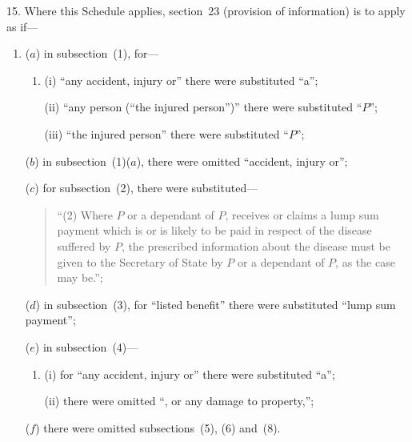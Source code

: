 \documentclass[12pt,a4paper]{article}
\begin{document}
15.  Where this Schedule applies, section~23 (provision of information) is to apply as if—
\begin{enumerate}\item[]
($a$) in subsection~(1), for—
\begin{enumerate}\item[]
(i) “any accident, injury or” there were substituted “a”;

(ii) “any person (“the injured person”)” there were substituted “$P$”;

(iii) “the injured person” there were substituted “$P$”;
\end{enumerate}

($b$) in subsection~(1)($a$), there were omitted “accident, injury or”;

($c$) for subsection~(2), there were substituted—
\begin{quotation}
“(2) Where $P$ or a dependant of $P$, receives or claims a lump sum payment which is or is likely to be paid in respect of the disease suffered by $P$, the prescribed information about the disease must be given to the Secretary of State by $P$ or a dependant of $P$, as the case may be.”;
\end{quotation}

($d$) in subsection~(3), for “listed benefit” there were substituted “lump sum payment”;

($e$) in subsection~(4)—
\begin{enumerate}\item[]
(i) for “any accident, injury or” there were substituted “a”;

(ii) there were omitted “, or any damage to property,”;
\end{enumerate}

($f$) there were omitted subsections~(5), (6) and~(8).
\end{enumerate}

\medskip
\end{document}
